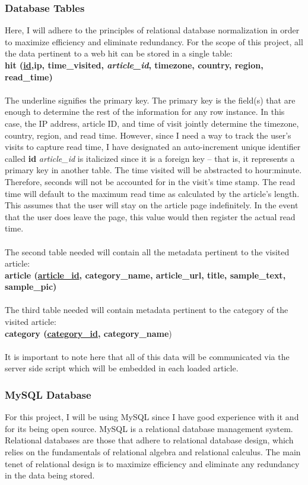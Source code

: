 \documentclass[12pt]{article}
\begin{document}
\subsubsection{Database Tables}
Here, I will adhere to the principles of relational database normalization in order to maximize efficiency and eliminate redundancy. For the scope of this project, all the data pertinent to a web hit can be stored in a single table: \\ 
{\large\textbf{hit (\underline{id},ip, time\_visited, \textit{article\_id}, timezone, country, region, read\_time)}} \\ \\
The underline signifies the primary key. The primary key is the field(s) that are enough to determine the rest of the information for any row instance. In this case, the IP address, article ID, and time of visit jointly determine the timezone, country, region, and read time. However, since I need a way to track the user's visits to capture read time, I have designated an auto-increment unique identifier called \textbf{id} \textit{article\_id} is italicized since it is a foreign key -- that is, it represents a primary key in another table. The time visited will be abstracted to hour:minute. Therefore, seconds will not be accounted for in the visit's time stamp. The read time will default to the maximum read time as calculated by the article's length. This assumes that the user will stay on the article page indefinitely. In the event that the user does leave the page, this value would then register the actual read time.
\\ \\
The second table needed will contain all the metadata pertinent to the visited article:\\
{\large\textbf{article (\underline{article\_id}, category\_name, article\_url, title, sample\_text, sample\_pic)}} \\ \\

The third table needed will contain metadata pertinent to the category of the visited article:\\
{\large\textbf{category (\underline{category\_id}, category\_name})}
\\ \\

It is important to note here that all of this data will be communicated via the server side script which will be embedded in each loaded article. 

\subsubsection{MySQL Database}
For this project, I will be using MySQL since I have good experience with it and for its being open source. MySQL is a relational database management system. Relational databases are those that adhere to relational database design, which relies on the fundamentals of relational algebra and relational calculus. The main tenet of relational design is to maximize efficiency and eliminate any redundancy in the data being stored.
\end{document}
